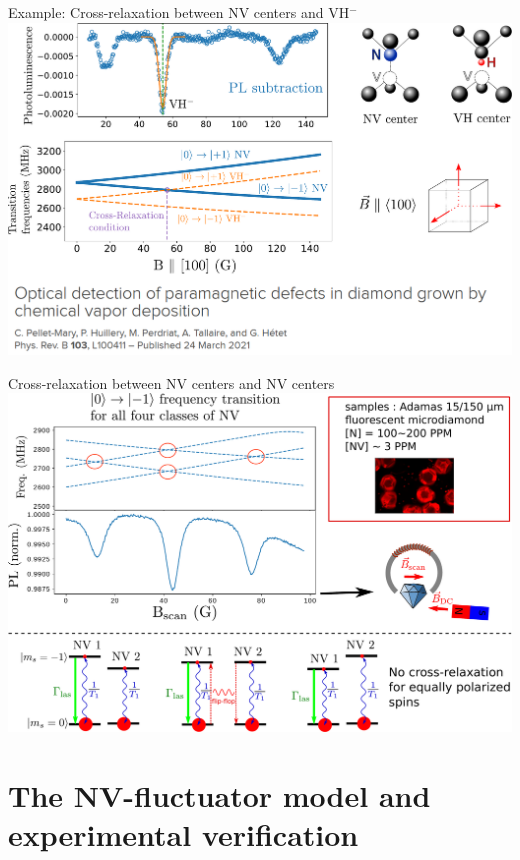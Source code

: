 \documentclass{beamer}
\begin{document}
\begin{frame}{Example: Cross-relaxation between NV centers and VH$^-$}
\centering
\includegraphics[width=\textwidth,height=0.9\textheight,keepaspectratio]{Slide_CR_VH}
\end{frame}

\begin{frame}{Cross-relaxation between NV centers and NV centers}
\centering
\includegraphics[width=\textwidth,height=0.9\textheight,keepaspectratio]{Slide_CR_adamas}
\end{frame}
\section{The NV-fluctuator model and experimental verification}
\end{document}
